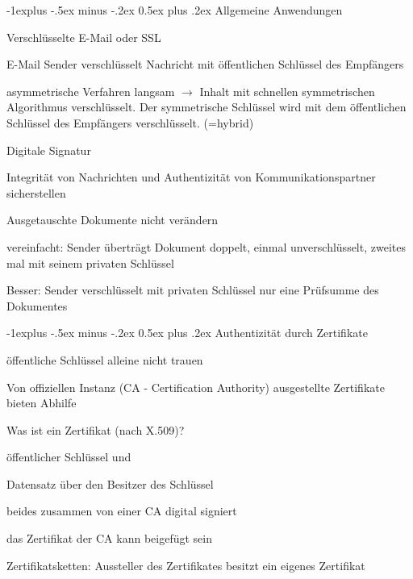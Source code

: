\documentclass[a4paper]{article}
\makeatletter
\renewcommand{\subsection}{\@startsection{subsection}{2}{0mm}%
                                {-1explus -.5ex minus -.2ex}%
                                {0.5ex plus .2ex}%
                                {\normalfont\normalsize\bfseries}}
\makeatother
\begin{document}
\begin{multicols*}{2}
  \subsection{Allgemeine Anwendungen}
  \begin{itemize*}
    \item Verschlüsselte E-Mail oder SSL
    \begin{itemize*}
      \item E-Mail Sender verschlüsselt Nachricht mit öffentlichen Schlüssel des Empfängers
      \item asymmetrische Verfahren langsam $\rightarrow$ Inhalt mit schnellen symmetrischen Algorithmus verschlüsselt. Der symmetrische Schlüssel wird mit dem öffentlichen Schlüssel des Empfängers verschlüsselt. (=hybrid)
    \end{itemize*}
    \item Digitale Signatur
    \begin{itemize*}
      \item Integrität von Nachrichten und Authentizität von Kommunikationspartner sicherstellen
      \item Ausgetauschte Dokumente nicht verändern
      \item vereinfacht: Sender überträgt Dokument doppelt, einmal unverschlüsselt, zweites mal mit seinem privaten Schlüssel
      \item Besser: Sender verschlüsselt mit privaten Schlüssel nur eine Prüfsumme des Dokumentes
    \end{itemize*}
  \end{itemize*}

  \subsection{Authentizität durch Zertifikate}
  \begin{itemize*}
    \item öffentliche Schlüssel alleine nicht trauen
    \item Von offiziellen Instanz (CA - Certification Authority) ausgestellte Zertifikate bieten Abhilfe
    \item Was ist ein Zertifikat (nach X.509)?
    \begin{itemize*}
      \item öffentlicher Schlüssel und
      \item Datensatz über den Besitzer des Schlüssel
      \item beides zusammen von einer CA digital signiert
      \item das Zertifikat der CA kann beigefügt sein
    \end{itemize*}
    \item Zertifikatsketten: Aussteller des Zertifikates besitzt ein eigenes Zertifikat
  \end{itemize*}


\end{multicols*}
\end{document}
